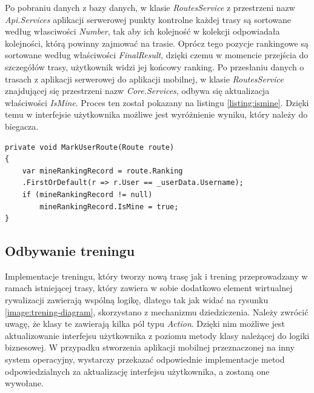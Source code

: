 Po pobraniu danych z bazy danych, w klasie \textit{RoutesService} z przestrzeni nazw \textit{Api.Services} aplikacji serwerowej punkty kontrolne każdej trasy są sortowane według własciwości \textit{Number}, tak aby ich kolejność w kolekcji odpowiadała kolejności, którą powinny zajmować na trasie. Oprócz tego pozycje rankingowe są sortowane według właściwości \textit{FinalResult}, dzięki czemu w momencie przejścia do szczegółów trasy, użytkownik widzi jej końcowy ranking. Po przesłaniu danych o trasach z aplikacji serwerowej do aplikacji mobilnej, w klasie \textit{RoutesService} znajdującej się przestrzeni nazw \textit{Core.Services}, odbywa się aktualizacja właściwości \textit{IsMine}. Proces ten został pokazany na listingu \ref{listing:ismine}. Dzięki temu w interfejsie użytkownika możliwe jest wyróżnienie wyniku, który należy do biegacza.
\begin{lstlisting}[caption={Aktualizacja właściwości IsMine klasy Route},label=listing:ismine]
private void MarkUserRoute(Route route)
{
	var mineRankingRecord = route.Ranking
	.FirstOrDefault(r => r.User == _userData.Username);
	if (mineRankingRecord != null)
		mineRankingRecord.IsMine = true;
}
\end{lstlisting}

\subsection{Odbywanie treningu}\label{chap:trening}
Implementacje treningu, który tworzy nową trasę jak i trening przeprowadzany w ramach istniejącej trasy, który zawiera w sobie dodatkowo element wirtualnej rywalizacji zawierają wspólną logikę, dlatego tak jak widać na rysunku \ref{image:trening-diagram}, skorzystano z mechanizmu dziedziczenia. Należy zwrócić uwagę, że klasy te zawierają kilka pól typu \textit{Action}. Dzięki nim możliwe jest aktualizowanie interfejsu użytkownika z poziomu metody klasy należącej do logiki biznesowej. W przypadku stworzenia aplikacji mobilnej przeznaczonej na inny system operacyjny, wystarczy przekazać odpowiednie implementacje metod odpowiedzialnych za aktualizację interfejsu użytkownika, a zostaną one wywołane. 

